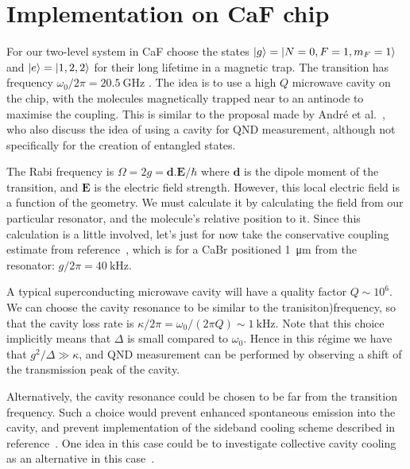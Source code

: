 \documentclass{article}
\begin{document}

\section{Implementation on CaF chip}

For our two-level system in CaF choose the states $\ket{g} = \ket{N=0, F=1,
m_F=1}$ and $\ket{e} = \ket{1, 2, 2}$ for their long lifetime in a magnetic
trap. The transition has frequency $\omega_0/2\pi = \SI{20.5}{\giga\hertz}$
\cite{Williams2018}. The idea is to use a high $Q$ microwave cavity on the
chip, with the molecules magnetically trapped near to an antinode to maximise
the coupling. This is similar to the proposal made by Andr\'e et
al.~\cite{Andre2006}, who also discuss the idea of using a cavity for QND
measurement, although not specifically for the creation of entangled states.

The Rabi frequency is $\Omega = 2g = \mathbf{d}.\mathbf{E}/\hbar$ where $\mathbf{d}$
is the dipole moment of the transition, and $\mathbf{E}$ is the electric field
strength. However, this local electric field is a function of the geometry. We
must calculate it by calculating the field from our particular resonator, and
the molecule's relative position to it. Since this calculation is a little
involved, let's just for now take the conservative coupling estimate from
reference~\cite{Andre2006}, which is for a CaBr positioned
\SI{1}{\micro\meter} from the resonator: $g/2\pi = \SI{40}{\kilo\hertz}$.

A typical superconducting microwave cavity will have a quality factor
$Q\sim10^6$. We can choose the cavity resonance to be similar to the
tranisiton)frequency, so that the cavity loss rate is $\kappa/2\pi =
\omega_0/(2\pi Q) \sim \SI{1}{\kilo\hertz}$. Note that this choice implicitly
means that $\Delta$ is small compared to $\omega_0$. Hence in this r\'egime we
have that $g^2/\Delta \gg \kappa$, and QND measurement can be performed
by observing a shift of the transmission peak of the cavity.

Alternatively, the cavity resonance could be chosen to be far from the
transition frequency. Such a choice would prevent enhanced spontaneous emission
into the cavity, and prevent implementation of the sideband cooling scheme
described in reference~\cite{Andre2006}. One idea in this case could be to
investigate collective cavity cooling as an alternative in this
case~\cite{SchleierSmith2011}.
\end{document}
